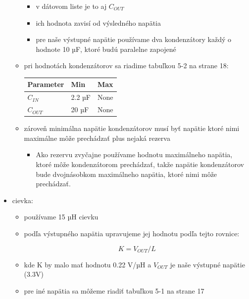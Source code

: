 \documentclass[12pt, twoside]{book}
\begin{document}
\begin{itemize}
\begin{itemize}
    \begin{itemize}
    
    \item
      v dátovom liste je to aj $C_{OUT}$
    \item
      ich hodnota zavisí od výsledného napätia
    \item
      pre naše výstupné napätie používame dva kondenzátory každý o
      hodnote 10 µF, ktoré budú paralelne zapojené
    \end{itemize}
  \item
    pri hodnotách kondenzátorov sa riadime tabuľkou 5-2 na strane 18:

    \begin{longtable}[]{@{}lll@{}}
    \toprule\noalign{}
    Parameter & Min & Max \\
    \midrule\noalign{}
    \endhead
    \bottomrule\noalign{}
    \endlastfoot
    $C_{IN}$ & 2.2 µF & None \\
    $C_{OUT}$ & 20 µF & None \\
    \end{longtable}
  \item
    zároveň minimálna napätie kondenzátorov musí byť napätie ktoré nimi
    maximálne môže prechádzať plus nejaká rezerva

    \begin{itemize}
    
    \item
      Ako rezervu zvyčajne používame hodnotu maximálneho napätia, ktoré môže kondenzátorom prechádzať, takže napätie kondenzátorov bude dvojnásobkom maximálneho napätia, ktoré nimi môže prechádzať.
    \end{itemize}
  \end{itemize}
\item
  cievka:

  \begin{itemize}
  \item
    používame 15 µH cievku
  \item
    podľa výstupného napätia upravujeme jej hodnotu podľa tejto rovnice:

    \[K = V_{OUT}/L\]
  \item
    kde K by malo mať hodnotu 0.22 V/µH a $V_{OUT}$ je naše výstupné napätie
    (3.3V)
  \item
    pre iné napätia sa môžeme riadiť tabuľkou 5-1 na strane 17


\end{itemize}
\end{itemize}
\end{document}

